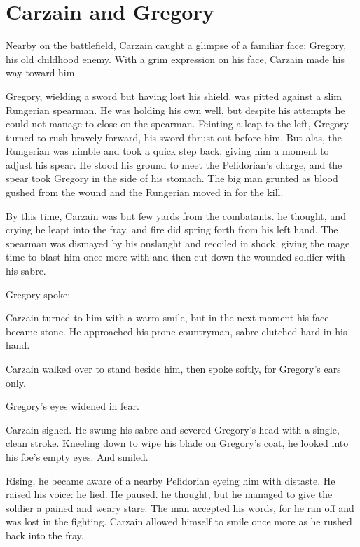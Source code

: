 \section{Carzain and Gregory}
Nearby on the battlefield, Carzain caught a glimpse of a familiar face: Gregory, his old childhood enemy. With a grim expression on his face, Carzain made his way toward him.

Gregory, wielding a sword but having lost his shield, was pitted against a slim Rungerian spearman. He was holding his own well, but despite his attempts he could not manage to close on the spearman. Feinting a leap to the left, Gregory turned to rush bravely forward, his sword thrust out before him. But alas, the Rungerian was nimble and took a quick step back, giving him a moment to adjust his spear. He stood his ground to meet the Pelidorian's charge, and the spear took Gregory in the side of his stomach. The big man grunted as blood gushed from the wound and the Rungerian moved in for the kill. 

By this time, Carzain was but few yards from the combatants.  he thought, and crying \talk{\Izion{}!} he leapt into the fray, and fire did spring forth from his left hand. The spearman was dismayed by his onslaught and recoiled in shock, giving the mage time to blast him once more with \Izion{} and then cut down the wounded soldier with his sabre. 

Gregory spoke:  

Carzain turned to him with a warm smile, but in the next moment his face became stone. He approached his prone countryman, sabre clutched hard in his hand.


Carzain walked over to stand beside him, then spoke softly, for Gregory's ears only. 

Gregory's eyes widened in fear. 

Carzain sighed.  He swung his sabre and severed Gregory's head with a single, clean stroke. Kneeling down to wipe his blade on Gregory's coat, he looked into his foe's empty eyes. And smiled. 

Rising, he became aware of a nearby Pelidorian eyeing him with distaste. He raised his voice:  he lied.  He paused.   he thought, but he managed to give the soldier a pained and weary stare. The man accepted his words, for he ran off and was lost in the fighting. Carzain allowed himself to smile once more as he rushed back into the fray. 
